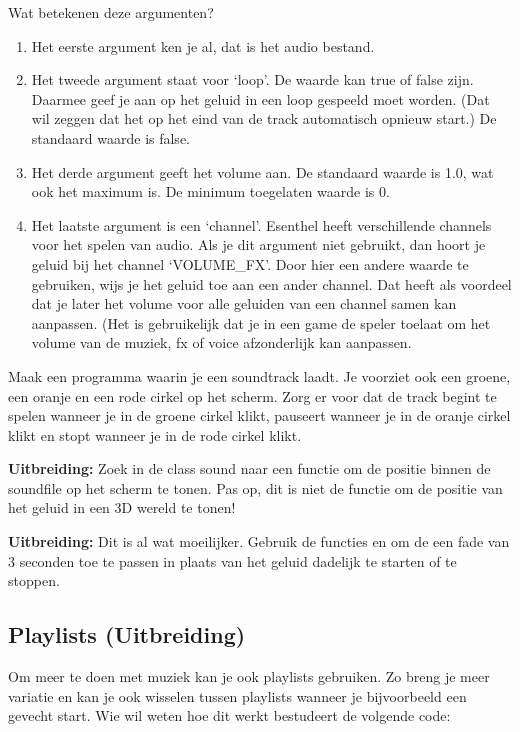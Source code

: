 Wat betekenen deze argumenten?

\begin{enumerate}
\item Het eerste argument ken je al, dat is het audio bestand.
\item Het tweede argument staat voor `loop'. De waarde kan true of false zijn. Daarmee geef je aan op het geluid in een loop gespeeld moet worden. (Dat wil zeggen dat het op het eind van de track automatisch opnieuw start.) De standaard waarde is false.
\item Het derde argument geeft het volume aan. De standaard waarde is 1.0, wat ook het maximum is. De minimum toegelaten waarde is 0.
\item Het laatste argument is een `channel'. Esenthel heeft verschillende channels voor het spelen van audio. Als je dit argument niet gebruikt, dan hoort je geluid bij het channel `VOLUME\_FX'. Door hier een andere waarde te gebruiken, wijs je het geluid toe aan een ander channel. Dat heeft als voordeel dat je later het volume voor alle geluiden van een channel samen kan aanpassen. (Het is gebruikelijk dat je in een game de speler toelaat om het volume van de muziek, fx of voice afzonderlijk kan aanpassen.
\end{enumerate}

\begin{exercise}
Maak een programma waarin je een soundtrack laadt. Je voorziet ook een groene, een oranje en een rode cirkel op het scherm. Zorg er voor dat de track begint te spelen wanneer je in de groene cirkel klikt, pauseert wanneer je in de oranje cirkel klikt en stopt wanneer je in de rode cirkel klikt.
\end{exercise}

\begin{exercise}
\textbf{Uitbreiding:} Zoek in de class sound naar een functie om de positie binnen de soundfile op het scherm te tonen. Pas op, dit is niet de functie om de positie van het geluid in een 3D wereld te tonen!
\end{exercise}

\begin{exercise}
\textbf{Uitbreiding:} Dit is al wat moeilijker. Gebruik de functies  en  om de een fade van 3 seconden toe te passen in plaats van het geluid dadelijk te starten of te stoppen.
\end{exercise}

\subsection{Playlists (Uitbreiding)}
Om meer te doen met muziek kan je ook playlists gebruiken. Zo breng je meer variatie en kan je ook wisselen tussen playlists wanneer je bijvoorbeeld een gevecht start. Wie wil weten hoe dit werkt bestudeert de volgende code:

